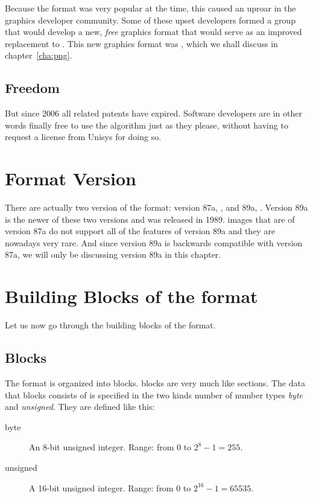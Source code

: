Because the \gif format was very popular at the time, this caused an
uproar in the graphics developer community. Some of these upset
developers formed a group that would develop a new, \textit{free}
graphics format that would serve as an improved replacement to
\gif. This new graphics format was \png, which we shall discuss in
chapter~\ref{cha:png}.

\subsection{Freedom}

But since 2006 all \lzw related patents have expired. Software
developers are in other words finally free to use the \lzw algorithm
just as they please, without having to request a license from Unisys
for doing so.

\section{Format Version}

There are actually two version of the \gif format: version 87a,
\cite{gif87a}, and 89a, \cite{gif89a}. Version 89a is the newer of
these two versions and was released in 1989. \gif images that are of
version 87a do not support all of the features of version 89a and they
are nowadays very rare. And since version 89a is backwards compatible
with version 87a, we will only be discussing version 89a in this
chapter.

\section{Building Blocks of the format}

Let us now go through the building blocks of the \gif format.

\subsection{Blocks}

The \gif format is organized into blocks. \gif blocks are very much like
\tga sections. The data that blocks consists of is specified in the two
kinds number of number types \textit{byte} and \textit{unsigned}. They
are defined like this:

\begin{description}
\item[byte] An 8-bit unsigned integer. Range: from 0 to $2^8 - 1 = 255$.
\item[unsigned] A 16-bit unsigned integer. Range: from 0 to $2^{16} -
  1 = 65535$.
\end{description}

